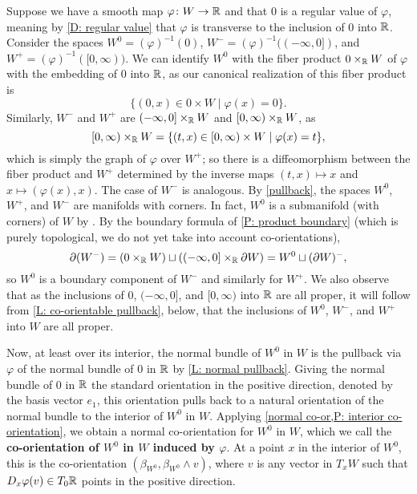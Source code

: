 \begin{example}\label{E: manifold decomposition}
	Suppose we have a smooth map $\varphi \colon W \to \mathbb{R}$ and that $0$ is a regular value of $\varphi$, meaning by \cref{D: regular value} that $\varphi$ is transverse to the inclusion of $0$ into $\mathbb{R}$.
	Consider the spaces $W^0 = (\varphi)^{-1}(0)$, $W^- = (\varphi)^{-1}((-\infty,0])$, and $W^+ = (\varphi)^{-1}([0,\infty))$.
	We can identify $W^0$ with the fiber product $0 \times_{\mathbb{R}} W$ of $\varphi$ with the embedding of $0$ into $\mathbb{R}$, as our canonical realization of this fiber product is
	$$\{(0,x) \in 0 \times W \mid \varphi (x)= 0\}.$$
	Similarly, $W^-$ and $W^+$ are $(-\infty,0] \times_{\mathbb{R}} W$ and $[0,\infty) \times_{\mathbb{R}} W$,
	as $$[0,\infty) \times_{\mathbb{R}} W = \{(t,x) \in [0,\infty) \times W \mid \varphi(x) = t\},$$
	which is simply the graph of $\varphi$ over $W^+$;
	so there is a diffeomorphism between the fiber product and $W^+$ determined by the inverse maps $(t,x) \mapsto x$ and $x \mapsto (\varphi(x), x)$.
	The case of $W^-$ is analogous.
	By \cref{pullback}, the spaces $W^0$, $W^+$, and $W^-$ are manifolds with corners.
	In fact, $W^0$ is a submanifold (with corners) of $W$ by \cite[Proposition 4.2.9]{MaDo92}.
	By the boundary formula of \cref{P: product boundary} (which is purely topological, we do not yet take into account co-orientations),
	$$\partial (W^-)= \left(0 \times_{\mathbb{R}} W\right) \sqcup \left((-\infty,0] \times_{\mathbb{R}} \partial W\right) = W^0 \sqcup (\partial W)^-,$$
	so $W^0$ is a boundary component of $W^-$ and similarly for $W^+$.
	We also observe that as the inclusions of $0$, $(-\infty,0]$, and $[0,\infty)$ into $\mathbb{R}$ are all proper, it will follow from \cref{L: co-orientable pullback}, below, that the inclusions of $W^0$, $W^-$, and $W^+$ into $W$ are all proper.

	Now, at least over its interior, the normal bundle of $W^0$ in $W$ is the pullback via $\varphi$ of the normal bundle of $0$ in $\mathbb{R}$ by \cref{L: normal pullback}. Giving the normal bundle of $0$ in $\mathbb{R}$ the standard orientation in the positive direction, denoted by the basis vector $e_1$, this orientation pulls back to a natural orientation of the normal bundle to the interior of $W^0$ in $W$. Applying \cref{normal co-or,P: interior co-orientation}, we obtain a normal co-orientation for $W^0$ in $W$, which we call the \textbf{co-orientation of $W^0$ in $W$ induced by $\varphi$}. At a point $x$ in the interior of $W^0$, this is the co-orientation $(\beta_{W^0}, \beta_{W^0} \wedge v)$, where $v$ is any vector in $T_x W$ such that $D_x \varphi (v) \in T_0 \mathbb{R}$ points in the positive direction.


\end{example}
